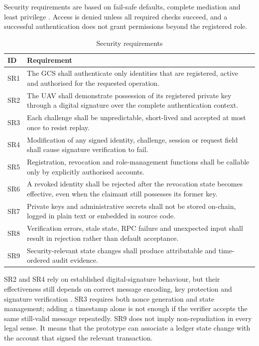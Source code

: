 Security requirements are based on fail-safe defaults, complete mediation and least privilege \cite{SaltzerSchroeder1975}. Access is denied unless all required checks succeed, and a successful authentication does not grant permissions beyond the registered role.

\begin{table}[htbp]
    \centering
    \caption{Security requirements}
    \label{tab:security-requirements}
    \begin{tabular}{|p{}|p{}|}
        \hline
        \textbf{ID} & \textbf{Requirement} \\
        \hline
        SR1 & The GCS shall authenticate only identities that are registered, active and authorised for the requested operation. \\
        \hline
        SR2 & The UAV shall demonstrate possession of its registered private key through a digital signature over the complete authentication context. \\
        \hline
        SR3 & Each challenge shall be unpredictable, short-lived and accepted at most once to resist replay. \\
        \hline
        SR4 & Modification of any signed identity, challenge, session or request field shall cause signature verification to fail. \\
        \hline
        SR5 & Registration, revocation and role-management functions shall be callable only by explicitly authorised accounts. \\
        \hline
        SR6 & A revoked identity shall be rejected after the revocation state becomes effective, even when the claimant still possesses its former key. \\
        \hline
        SR7 & Private keys and administrative secrets shall not be stored on-chain, logged in plain text or embedded in source code. \\
        \hline
        SR8 & Verification errors, stale state, RPC failure and unexpected input shall result in rejection rather than default acceptance. \\
        \hline
        SR9 & Security-relevant state changes shall produce attributable and time-ordered audit evidence. \\
        \hline
    \end{tabular}
\end{table}

SR2 and SR4 rely on established digital-signature behaviour, but their effectiveness still depends on correct message encoding, key protection and signature verification \cite{NISTFIPS1865}. SR3 requires both nonce generation and state management; adding a timestamp alone is not enough if the verifier accepts the same still-valid message repeatedly. SR9 does not imply non-repudiation in every legal sense. It means that the prototype can associate a ledger state change with the account that signed the relevant transaction.

